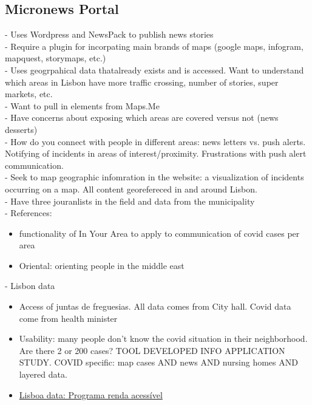 \subsection{Micronews Portal}\cite{Carvalho2020}
- Uses Wordpress and NewsPack to publish news stories\\
- Require a plugin for incorpating main brands of maps (google maps, infogram, mapquest, storymaps, etc.)\\
- Uses geogrpahical data thatalready exists and is accessed. Want to understand which areas in Lisbon have more traffic crossing, number of stories, super markets, etc.\\
- Want to pull in elements from Maps.Me\\
- Have concerns about exposing which areas are covered versus not (news desserts)\\
- How do you connect with people in different areas: news letters vs. push alerts. Notifying of incidents in areas of interest/proximity. Frustrations with push alert communication.\\
- Seek to map geographic infomration in the website: a visualization of incidents occurring on a map. All content georefereced in and around Lisbon.\\
- Have three jouranlists in the field and data from the municipality\\
- References:
\begin{itemize}
	\item functionality of In Your Area to apply to communication of covid cases per area
	\item Oriental: orienting people in the middle east
\end{itemize}
- Lisbon data
\begin{itemize}
	\item {\color{orange}Access of juntas de freguesias.  All data comes from City hall. Covid data come from health minister}
	\item {\color{orange} Usability: many people don’t know the covid situation in their neighborhood. Are there 2 or 200 cases? TOOL DEVELOPED INFO APPLICATION STUDY. COVID specific: map cases AND news AND nursing homes AND layered data.}
	\item \href{https://www.lisboa.pt/fileadmin/cidade_temas/habitacao/listas/PRA3_lista_candidatos_sorteados_habitacao.pdf}{Lisboa data: Programa renda acessível}
\end{itemize}


